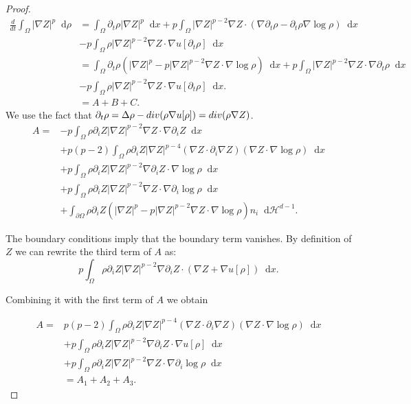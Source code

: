 \documentclass[a4paper,twosided, 11pt]{article}
\newcommand {\Div}  { {\rm div} }
\newcommand {\f}   {\frac}
\newcommand {\p}   {\partial}
\theoremstyle{plain}
\theoremstyle{remark}
\newcommand{\diff}{\mathop{}\!\mathrm{d}}
\numberwithin{equation}{section}
\begin{document}
\begin{proof}

\begin{align*}
\f{d}{dt}\int_{\Omega} |\nabla Z|^p\diff \rho &= \int_{\Omega} \p_t\rho |\nabla Z|^p \diff x + p \int_{\Omega} |\nabla Z|^{p-2}\nabla Z\cdot(\nabla \p_t\rho-\p_t\rho\nabla\log\rho)\diff x\\
&-p\int_{\Omega} \rho |\nabla Z|^{p-2} \nabla Z\cdot \nabla u[\p_{t}\rho] \diff x  \\
&= \int_{\Omega} \p_{t}\rho \left(|\nabla Z|^p -p|\nabla Z|^{p-2}\nabla Z\cdot\nabla\log\rho\right) \diff x+ p\int_{\Omega} |\nabla Z|^{p-2}\nabla Z\cdot\nabla\p_t\rho\diff x\\
&- p\int_{\Omega} \rho |\nabla Z|^{p-2} \nabla Z\cdot \nabla u[\p_{t}\rho]\diff x.    \\
&= A+B+C.
\end{align*}
We use the fact that $\p_t \rho = \Delta \rho - \Div(\rho\nabla u[\rho])= \Div(\rho\nabla Z)$.
\begin{align*}
A= &-p\int_{\Omega} \rho \p_i Z |\nabla Z|^{p-2}\nabla Z\cdot \nabla\p_{i} Z \diff x\\
&+p(p-2)\int_{\Omega} \rho \p_i Z |\nabla Z|^{p-4} (\nabla Z\cdot \p_i \nabla Z) (\nabla Z\cdot \nabla\log\rho)\diff x\\
& + p\int_{\Omega} \rho \p_i Z |\nabla Z|^{p-2}\nabla \p_i Z\cdot \nabla\log\rho\diff x\\
& + p\int_{\Omega} \rho \p_i Z |\nabla Z|^{p-2} \nabla Z\cdot \nabla \p_i \log\rho\diff x\\
& + \int_{\p\Omega}\rho \p_{i}Z \left(|\nabla Z|^{p} - p |\nabla Z|^{p-2} \nabla Z\cdot \nabla \log \rho \right)n_{i}\diff \mathcal{H}^{d-1}.
\end{align*}

The boundary conditions imply that the boundary term vanishes. By definition of $Z$ we can rewrite the third term of $A$ as:
$$
p\int_{\Omega} \rho \p_i Z |\nabla Z|^{p-2}\nabla \p_i Z \cdot(\nabla Z+ \nabla u[\rho]) \diff x.
$$

Combining it with the first term of $A$ we obtain 

\begin{align*}
A=&p(p-2)\int_{\Omega} \rho \p_i Z |\nabla Z|^{p-4} (\nabla Z\cdot \p_i \nabla Z) (\nabla Z\cdot \nabla\log\rho)\diff x\\
& + p\int_{\Omega} \rho \p_i Z |\nabla Z|^{p-2}\nabla \p_i Z\cdot \nabla u[\rho]\diff x\\
& + p\int_{\Omega} \rho \p_i Z |\nabla Z|^{p-2} \nabla Z\cdot \nabla \p_i \log\rho\diff x\\
& = A_1 + A_2 + A_3.
\end{align*}


\end{proof}
\end{document}

